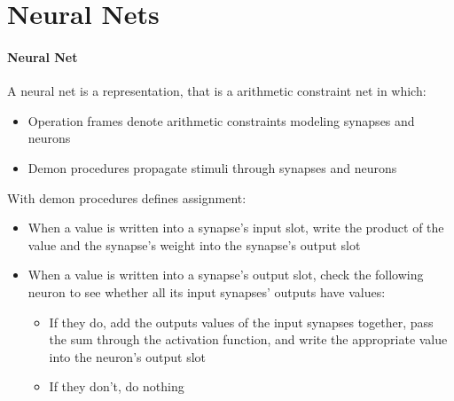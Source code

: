 \section{Neural Nets}

\paragraph{Neural Net} A neural net is a representation, that is a
arithmetic constraint net in which:
\begin{itemize}
  \item Operation frames denote arithmetic constraints modeling
    synapses and neurons
  \item Demon procedures propagate stimuli through synapses and
    neurons
\end{itemize}
With demon procedures defines assignment:
\begin{itemize}
  \item When a value is written into a synapse's input slot, write
    the product of the value and the synapse's weight into the
    synapse's output slot
  \item When a value is written into a synapse's output slot,
    check the following neuron to see whether all its input
    synapses' outputs have values:
    \begin{itemize}
      \item If they do, add the outputs values of the input
        synapses together, pass the sum through the activation
        function, and write the appropriate value into the
        neuron's output slot
      \item If they don't, do nothing
    \end{itemize}
\end{itemize}

